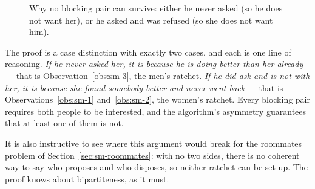 \begin{figure}[ht]
\centering
{}
\caption{Why no blocking pair can survive: either he never asked (so he does
not want her), or he asked and was refused (so she does not want him).}
\label{fig:sm-stabilityproof}
\end{figure}

\begin{intuition}
The proof is a case distinction with exactly two cases, and each is one line
of reasoning. \emph{If he never asked her, it is because he is doing better
than her already} --- that is Observation~\ref{obs:sm-3}, the men's ratchet.
\emph{If he did ask and is not with her, it is because she found somebody
better and never went back} --- that is Observations~\ref{obs:sm-1}
and~\ref{obs:sm-2}, the women's ratchet. Every blocking pair requires both people
to be interested, and the algorithm's asymmetry guarantees that at least one
of them is not.

It is also instructive to see where this argument would break for the
roommates problem of Section~\ref{sec:sm-roommates}: with no two sides, there is
no coherent way to say who proposes and who disposes, so neither ratchet can
be set up. The proof knows about bipartiteness, as it must.
\end{intuition}

